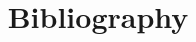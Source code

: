 \documentclass[language=assamese]{bookbangla}
\title{Bibliography}
\begin{document}
\sloppy
\nocite{*}
\printbibliography
\end{document}
